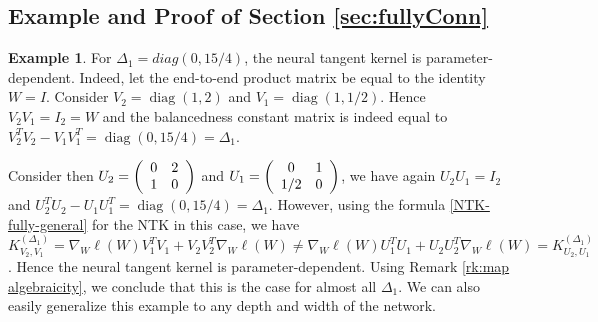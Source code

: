 \documentclass[twoside]{article}
\theoremstyle{definition}
\newtheorem{example}[theorem]{Example}
\theoremstyle{remark}
\begin{document}
\subsection{Example and Proof of Section \ref{sec:fullyConn}}
\begin{example}\label{ex:fullyconnected}
    For $\Delta_1=diag(0,15/4)$, the neural tangent kernel is parameter-dependent.
    Indeed, let the end-to-end product matrix be equal to the identity $W=I$. Consider $V_2=\operatorname{diag}(1,2)$ and $V_1=\operatorname{diag}(1,1/2)$. Hence $V_2V_1=I_2=W$ and the balancedness constant matrix is indeed equal to $V_2^TV_2 - V_1 V_1^T = \operatorname{diag}(0,15/4) = \Delta_1$.

Consider then $U_2 = \left( \begin{array}{c c}
    0 & 2 \\
    1 & 0
\end{array} \right)$ and $U_1 = \left(\begin{array}{c c}
    0 & 1 \\
    1/2 & 0
\end{array} \right)$, we have again $U_2U_1=I_2$ and $U_2^TU_2 - U_1 U_1^T = \operatorname{diag}(0,15/4)=\Delta_1$. However, using the formula \eqref{NTK-fully-general} for the NTK in this case, we have $ K^{(\Delta_1)}_{V_2,V_1} = \nabla_W \ell(W) V_1^T V_1 + V_2 V_2^T \nabla_W \ell(W)  \neq \nabla_W \ell(W) U_1^T  U_1 + U_2 U_2^T \nabla_W \ell(W) = K^{(\Delta_1)}_{U_2,U_1}$. 
Hence the neural tangent kernel is parameter-dependent. Using Remark \ref{rk:map algebraicity}, we conclude that this is the case for almost all $\Delta_1$. We can also easily generalize this example to any depth and width of the network.
\end{example}
\end{document}
